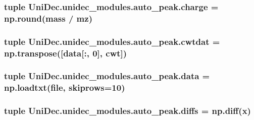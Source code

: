 \subsubsection[{charge}]{\setlength{\rightskip}{0pt plus 5cm}tuple Uni\+Dec.\+unidec\+\_\+modules.\+auto\+\_\+peak.\+charge = np.\+round({\bf mass} / {\bf mz})}\label{namespace_uni_dec_1_1unidec__modules_1_1auto__peak_a0b8fb630219ca26395b19245cb509a45}
\hypertarget{namespace_uni_dec_1_1unidec__modules_1_1auto__peak_ab2f41ee4c2753756fa96017905742239}{}
\subsubsection[{cwtdat}]{\setlength{\rightskip}{0pt plus 5cm}tuple Uni\+Dec.\+unidec\+\_\+modules.\+auto\+\_\+peak.\+cwtdat = np.\+transpose(\mbox{[}{\bf data}\mbox{[}\+:, 0\mbox{]}, cwt\mbox{]})}\label{namespace_uni_dec_1_1unidec__modules_1_1auto__peak_ab2f41ee4c2753756fa96017905742239}
\hypertarget{namespace_uni_dec_1_1unidec__modules_1_1auto__peak_a31996c2b129f976b613fb06f3ccf43a2}{}
\subsubsection[{data}]{\setlength{\rightskip}{0pt plus 5cm}tuple Uni\+Dec.\+unidec\+\_\+modules.\+auto\+\_\+peak.\+data = np.\+loadtxt({\bf file}, skiprows=10)}\label{namespace_uni_dec_1_1unidec__modules_1_1auto__peak_a31996c2b129f976b613fb06f3ccf43a2}
\hypertarget{namespace_uni_dec_1_1unidec__modules_1_1auto__peak_a62ff64d63d5be230f7ff5b24fa4b28c2}{}
\subsubsection[{diffs}]{\setlength{\rightskip}{0pt plus 5cm}tuple Uni\+Dec.\+unidec\+\_\+modules.\+auto\+\_\+peak.\+diffs = np.\+diff({\bf x})}\label{namespace_uni_dec_1_1unidec__modules_1_1auto__peak_a62ff64d63d5be230f7ff5b24fa4b28c2}
\hypertarget{namespace_uni_dec_1_1unidec__modules_1_1auto__peak_aed4928bf8418274fa1155d36675f0b3c}{}
